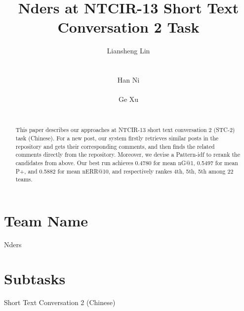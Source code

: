\documentclass{sig-alternate}
\begin{document}
\title{Nders at NTCIR-13 Short Text Conversation 2 Task}

\author{
%
%
\alignauthor
Liansheng Lin\\
       \\
       \\
\alignauthor
Han Ni\\
       \\
\alignauthor 
Ge Xu\\
       \\
}



\maketitle

\begin{abstract}
This paper describes our approaches at NTCIR-13 short text conversation 2 
(STC-2) task (Chinese). For a new post, our system firstly retrieves similar posts 
in the repository and gets their corresponding comments, and then finds the 
related comments directly from the repository. Moreover, we devise a Pattern-idf 
to rerank the candidates from above. Our best run achieves 0.4780 for mean nG@1, 
0.5497 for mean P+, and 0.5882 for mean nERR@10, and respectively rankes 4th, 
5th, 5th among 22 teams. 
\end{abstract}

\section*{Team Name}
Nders

\section*{Subtasks}
Short Text Conversation 2 (Chinese)
\end{document}
